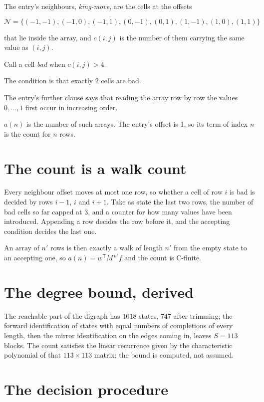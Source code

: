 \documentclass[11pt]{article}
\theoremstyle{definition}
\begin{document}
The entry's neighbours, {\itshape king-move}, are the cells at the offsets

\[\mathcal{N} = \{(-1,-1), (-1,0), (-1,1), (0,-1), (0,1), (1,-1), (1,0), (1,1)\}\]

that lie inside the array, and $c(i,j)$ is the number of them carrying the same value as $(i,j)$.

Call a cell {\itshape bad} when $c(i,j) > 4$.

The condition is that exactly 2 cells are bad.

The entry's further clause says that reading the array row by row the values $0,\dots,1$ first occur in increasing order.

$a(n)$ is the number of such arrays. The entry's offset is 1, so its term of index $n$ is the count for $n$ rows.

\section{The count is a walk count}

Every neighbour offset moves at most one row, so whether a cell of row $i$ is bad is decided by rows $i-1$, $i$ and $i+1$. Take as state the last two rows, the number of bad cells so far capped at 3, and a counter for how many values have been introduced. Appending a row decides the row before it, and the accepting condition decides the last one.

An array of $n'$ rows is then exactly a walk of length $n'$ from the empty state to an accepting one, so $a(n) = w^{\mathsf T}M^{\,n'}f$ and the count is C-finite.

\section{The degree bound, derived}

The reachable part of the digraph has $1018$ states, $747$ after trimming; the forward identification of states with equal numbers of completions of every length, then the mirror identification on the edges coming in, leaves $S = 113$ blocks. The count satisfies the linear recurrence given by the characteristic polynomial of that $113\times113$ matrix; the bound is computed, not assumed.

\section{The decision procedure}
\end{document}
